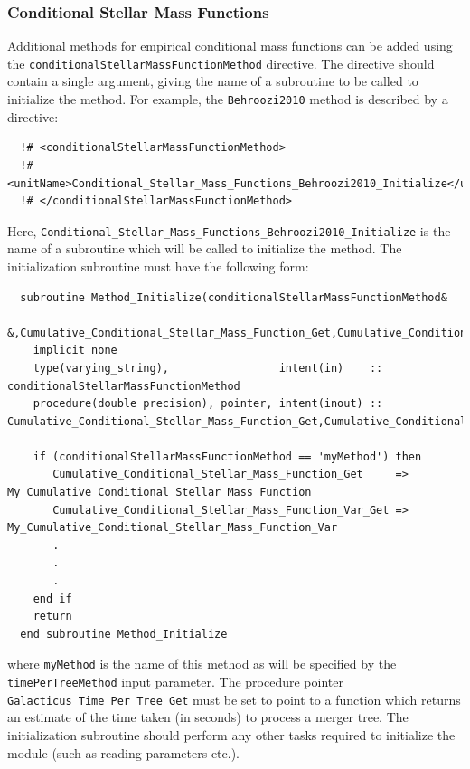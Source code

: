 \subsubsection{Conditional Stellar Mass Functions}

Additional methods for empirical conditional mass functions can be added using the {\tt conditionalStellarMassFunctionMethod} directive. The directive should contain a single argument, giving the name of a subroutine to be called to initialize the method. For example, the {\tt Behroozi2010} method is described by a directive:
\begin{verbatim}
  !# <conditionalStellarMassFunctionMethod>
  !#  <unitName>Conditional_Stellar_Mass_Functions_Behroozi2010_Initialize</unitName>
  !# </conditionalStellarMassFunctionMethod>
\end{verbatim}
Here, {\tt Conditional\_Stellar\_Mass\_Functions\_Behroozi2010\_Initialize} is the name of a subroutine which will be called to initialize the method. The initialization subroutine must have the following form:
\begin{verbatim}
  subroutine Method_Initialize(conditionalStellarMassFunctionMethod&
       &,Cumulative_Conditional_Stellar_Mass_Function_Get,Cumulative_Conditional_Stellar_Mass_Function_Var_Get)
    implicit none
    type(varying_string),                 intent(in)    :: conditionalStellarMassFunctionMethod
    procedure(double precision), pointer, intent(inout) :: Cumulative_Conditional_Stellar_Mass_Function_Get,Cumulative_Conditional_Stellar_Mass_Function_Var_Get
    
    if (conditionalStellarMassFunctionMethod == 'myMethod') then
       Cumulative_Conditional_Stellar_Mass_Function_Get     => My_Cumulative_Conditional_Stellar_Mass_Function
       Cumulative_Conditional_Stellar_Mass_Function_Var_Get => My_Cumulative_Conditional_Stellar_Mass_Function_Var
       .
       .
       .
    end if
    return
  end subroutine Method_Initialize
\end{verbatim}
where {\tt myMethod} is the name of this method as will be specified by the {\tt timePerTreeMethod} input parameter. The procedure pointer {\tt Galacticus\_Time\_Per\_Tree\_Get} must be set to point to a function which returns an estimate of the time taken (in seconds) to process a merger tree. The initialization subroutine should perform any other tasks required to initialize the module (such as reading parameters etc.).

